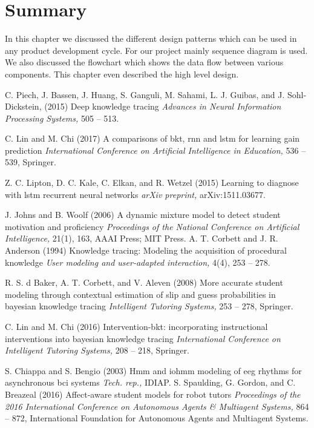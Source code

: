 \documentclass[12pt,a4paper,oneside]{report}
\begin{document}
\section{Summary}
In this chapter we discussed the different design patterns which can be used in any product development cycle. For our project mainly sequence diagram is used. We also discussed the flowchart which shows the data flow between various components. This chapter even described the high level design.

\begin{thebibliography}{9}
 C. Piech, J. Bassen, J. Huang, S. Ganguli, M. Sahami, L. J. Guibas, and J. Sohl-Dickstein, (2015)
		\newblock Deep knowledge tracing
		\newblock \emph{Advances in Neural Information Processing Systems,} 505 -- 513.
		
		 C. Lin and M. Chi (2017)
		\newblock A comparisons of bkt, rnn and lstm for learning gain prediction
		\newblock \emph{International Conference on Artificial Intelligence in Education,} 536 -- 539, Springer.
		
		 Z. C. Lipton, D. C. Kale, C. Elkan, and R. Wetzel (2015)
		\newblock Learning to diagnose with lstm recurrent neural networks
		\newblock \emph{arXiv preprint,} arXiv:1511.03677.
		
		 J. Johns and B. Woolf (2006)
		\newblock A dynamic mixture model to detect student motivation and proficiency
		\newblock \emph{Proceedings of the National Conference on Artificial Intelligence,} 21(1), 163, AAAI Press; MIT Press.
		 A. T. Corbett and J. R. Anderson (1994)
		\newblock Knowledge tracing: Modeling the acquisition of procedural knowledge
		\newblock \emph{User modeling and user-adapted interaction,} 4(4), 253 -- 278.
		
		 R. S. d Baker, A. T. Corbett, and V. Aleven (2008)
		\newblock More accurate student modeling through contextual estimation of slip and guess probabilities in bayesian knowledge tracing
		\newblock \emph{Intelligent Tutoring Systems,} 253 -- 278, Springer.
		
		 C. Lin and M. Chi (2016)
		\newblock Intervention-bkt: incorporating instructional interventions into bayesian knowledge tracing
		\newblock \emph{International Conference on Intelligent Tutoring Systems,} 208 -- 218, Springer.
		
		 S. Chiappa and S. Bengio (2003)
		\newblock Hmm and iohmm modeling of eeg rhythms
for asynchronous bci systems
		\newblock \emph{Tech. rep.,} IDIAP.
		 S. Spaulding, G. Gordon, and C. Breazeal (2016)
		\newblock Affect-aware student models for robot tutors
		\newblock \emph{Proceedings of the 2016 International Conference on Autonomous Agents \& Multiagent Systems,} 864 -- 872, International
Foundation for Autonomous Agents and Multiagent Systems.
		

\end{thebibliography}
\end{document}
